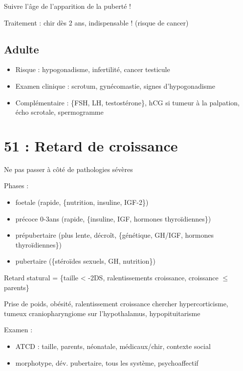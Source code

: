 \documentclass[11pt]{article}
\begin{document}
Suivre l'âge de l'apparition de la puberté !

Traitement : chir dès 2 ans, indispensable ! (risque de cancer)
\subsection{Adulte}
\label{sec:orgfb11fad}
\begin{itemize}
\item Risque : hypogonadisme, infertilité, cancer testicule
\item Examen clinique : scrotum, gynécomastie, signes d'hypogonadisme
\item Complémentaire : \{FSH, LH, testostérone\}, hCG si tumeur à la palpation, écho
scrotale, spermogramme
\end{itemize}
\section{51 : Retard de croissance}
\label{sec:orgb6034f0}
\danger Ne pas passer à côté de pathologies sévères

Phases : 
\begin{itemize}
\item foetale (rapide, \{nutrition, insuline, IGF-2\})
\item précoce 0-3ans (rapide, \{insuline, IGF, hormones thyroïdiennes\})
\item prépubertaire (plus lente, décroît, \{génétique, GH/IGF, hormones thyroïdiennes\})
\item pubertaire (\{stéroïdes sexuels, GH, nutrition\})
\end{itemize}

Retard statural = \{taille < -2DS, ralentissements croissance, croissance \(\le\) parents\}

Prise de poids, obésité, ralentissement croissance \thus chercher
hypercorticisme, tumeux craniopharyngiome sur l'hypothalamus, hypopituitarisme

Examen :
\begin{itemize}
\item ATCD : taille, parents, néonatale, médicaux/chir, contexte social
\item morphotype, dév. pubertaire, tous les système, psychoaffectif
\end{itemize}
\end{document}
